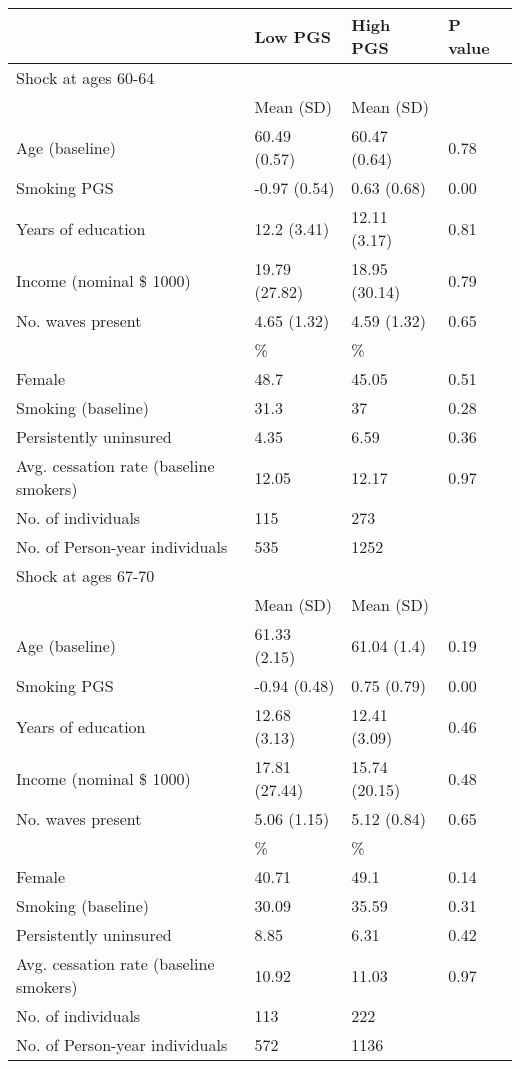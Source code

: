 % 
\begin{tabular}{llll}
  \toprule
\textbf{  } & \textbf{ Low PGS } & \textbf{ High PGS } & \textbf{ P value } \\ 
  \midrule
Shock at ages 60-64 &  &  &  \\ 
   \midrule
 & Mean (SD) & Mean (SD) &  \\ 
  Age (baseline) & 60.49 (0.57) & 60.47 (0.64) & 0.78 \\ 
  Smoking PGS & -0.97 (0.54) & 0.63 (0.68) & 0.00 \\ 
  Years of education & 12.2 (3.41) & 12.11 (3.17) & 0.81 \\ 
  Income (nominal \$ 1000) & 19.79 (27.82) & 18.95 (30.14) & 0.79 \\ 
  No. waves present & 4.65 (1.32) & 4.59 (1.32) & 0.65 \\ 
   & \% & \% &  \\ 
  Female & 48.7 & 45.05 & 0.51 \\ 
  Smoking (baseline) & 31.3 & 37 & 0.28 \\ 
  Persistently uninsured & 4.35 & 6.59 & 0.36 \\ 
  Avg. cessation rate (baseline smokers) & 12.05 & 12.17 & 0.97 \\ 
   \midrule
No. of individuals & 115 & 273 &  \\ 
  No. of Person-year individuals & 535 & 1252 &  \\ 
   \midrule
Shock at ages 67-70 &  &  &  \\ 
   \midrule
 & Mean (SD) & Mean (SD) &  \\ 
  Age (baseline) & 61.33 (2.15) & 61.04 (1.4) & 0.19 \\ 
  Smoking PGS & -0.94 (0.48) & 0.75 (0.79) & 0.00 \\ 
  Years of education & 12.68 (3.13) & 12.41 (3.09) & 0.46 \\ 
  Income (nominal \$ 1000) & 17.81 (27.44) & 15.74 (20.15) & 0.48 \\ 
  No. waves present & 5.06 (1.15) & 5.12 (0.84) & 0.65 \\ 
   & \% & \% &  \\ 
  Female & 40.71 & 49.1 & 0.14 \\ 
  Smoking (baseline) & 30.09 & 35.59 & 0.31 \\ 
  Persistently uninsured & 8.85 & 6.31 & 0.42 \\ 
  Avg. cessation rate (baseline smokers) & 10.92 & 11.03 & 0.97 \\ 
   \midrule
No. of individuals & 113 & 222 &  \\ 
  No. of Person-year individuals & 572 & 1136 &  \\ 
   \bottomrule
\end{tabular}
